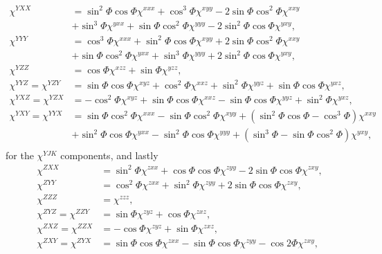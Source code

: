 \documentclass[aps,prb,10pt,letterpaper,notitlepage]{revtex4-1}
\begin{document}
\begin{equation*}
\begin{split}
\chi^{YXX}
&=  \sin^{2}\Phi \cos\Phi \chi^{xxx}
 +  \cos^{3}\Phi          \chi^{xyy}
 - 2\sin\Phi \cos^{2}\Phi \chi^{xxy}\\
&+  \sin^{3}\Phi          \chi^{yxx}
 +  \sin\Phi \cos^{2}\Phi \chi^{yyy}
 - 2\sin^{2}\Phi \cos\Phi \chi^{yxy},\\[10pt]
\chi^{YYY}
&=  \cos^{3}\Phi          \chi^{xxx}
 +  \sin^{2}\Phi \cos\Phi \chi^{xyy}
 + 2\sin\Phi \cos^{2}\Phi \chi^{xxy}\\
&+  \sin\Phi \cos^{2}\Phi \chi^{yxx}
 +  \sin^{3}\Phi          \chi^{yyy}
 + 2\sin^{2}\Phi \cos\Phi \chi^{yxy},\\[10pt]
\chi^{YZZ}
&= \cos\Phi \chi^{xzz} + \sin\Phi \chi^{yzz},\\[10pt]
\chi^{YYZ} = \chi^{YZY}
&= \sin\Phi \cos\Phi \chi^{xyz}
 + \cos^{2}\Phi      \chi^{xxz}
 + \sin^{2}\Phi      \chi^{yyz}
 + \sin\Phi \cos\Phi \chi^{yxz},\\[10pt]
\chi^{YXZ} = \chi^{YZX}
&=
- \cos^{2}\Phi      \chi^{xyz}
+ \sin\Phi \cos\Phi \chi^{xxz}
- \sin\Phi \cos\Phi \chi^{yyz}
+ \sin^{2}\Phi      \chi^{yxz},\\[10pt]
\chi^{YXY} = \chi^{YYX}
&= \sin\Phi \cos^{2}\Phi \chi^{xxx}
 - \sin\Phi \cos^{2}\Phi \chi^{xyy}
 + (\sin^{2}\Phi \cos\Phi - \cos^{3}\Phi) \chi^{xxy}\\
&+ \sin^{2}\Phi \cos\Phi \chi^{yxx}
 - \sin^{2}\Phi \cos\Phi \chi^{yyy}
 + (\sin^{3}\Phi - \sin\Phi \cos^{2}\Phi) \chi^{yxy},\\[10pt]
\end{split}
\end{equation*}
for the $\chi^{YJK}$ components, and lastly
\begin{equation*}
\begin{split}
\chi^{ZXX}
&=  \sin^{2}\Phi      \chi^{zxx}
 +  \cos\Phi \cos\Phi \chi^{zyy}
 - 2\sin\Phi \cos\Phi \chi^{zxy},\\[10pt]
\chi^{ZYY}
&=  \cos^{2}\Phi      \chi^{zxx}
 +  \sin^{2}\Phi      \chi^{zyy}
 + 2\sin\Phi \cos\Phi \chi^{zxy},\\[10pt]
\chi^{ZZZ} &=  \chi^{zzz},\\[10pt]
\chi^{ZYZ} = \chi^{ZZY}
&= \sin\Phi \chi^{zyz}
 + \cos\Phi \chi^{zxz},\\[10pt]
\chi^{ZXZ} = \chi^{ZZX}
&= 
- \cos\Phi \chi^{zyz}
+ \sin\Phi \chi^{zxz},\\[10pt]
\chi^{ZXY} = \chi^{ZYX}
&= \sin\Phi \cos\Phi \chi^{zxx}
 - \sin\Phi \cos\Phi \chi^{zyy}
 - \cos2\Phi         \chi^{zxy},
\end{split}
\end{equation*}
\end{document}
